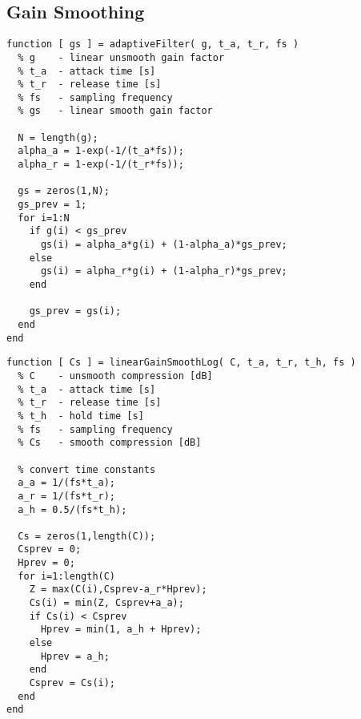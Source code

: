 \documentclass[../main2.tex]{subfiles}
\begin{document}
\subsection{Gain Smoothing}
\begin{lstlisting}[style=customc]
function [ gs ] = adaptiveFilter( g, t_a, t_r, fs )
  % g    - linear unsmooth gain factor
  % t_a  - attack time [s]
  % t_r  - release time [s]
  % fs   - sampling frequency
  % gs   - linear smooth gain factor

  N = length(g);
  alpha_a = 1-exp(-1/(t_a*fs));
  alpha_r = 1-exp(-1/(t_r*fs));
    
  gs = zeros(1,N);
  gs_prev = 1;
  for i=1:N
    if g(i) < gs_prev
      gs(i) = alpha_a*g(i) + (1-alpha_a)*gs_prev;
    else
      gs(i) = alpha_r*g(i) + (1-alpha_r)*gs_prev;
    end
        
    gs_prev = gs(i);
  end
end
\end{lstlisting}


\begin{lstlisting}[style=customc]
function [ Cs ] = linearGainSmoothLog( C, t_a, t_r, t_h, fs )
  % C    - unsmooth compression [dB]
  % t_a  - attack time [s]
  % t_r  - release time [s]
  % t_h  - hold time [s]
  % fs   - sampling frequency
  % Cs   - smooth compression [dB]

  % convert time constants
  a_a = 1/(fs*t_a);
  a_r = 1/(fs*t_r);
  a_h = 0.5/(fs*t_h);
    
  Cs = zeros(1,length(C));
  Csprev = 0;
  Hprev = 0;
  for i=1:length(C)
    Z = max(C(i),Csprev-a_r*Hprev);
    Cs(i) = min(Z, Csprev+a_a); 
    if Cs(i) < Csprev
      Hprev = min(1, a_h + Hprev);
    else 
      Hprev = a_h;
    end
    Csprev = Cs(i);
  end
end
\end{lstlisting}

\end{document}
